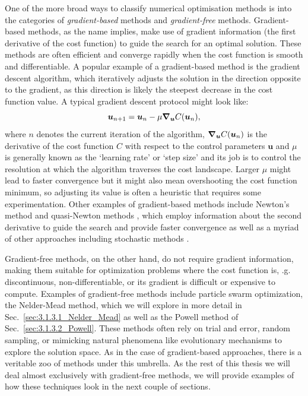 \documentclass[a4paper,oneside,11pt]{book}
\newcommand{\ubb}{\boldsymbol{u}}
\begin{document}
One of the more broad ways to classify numerical optimisation methods is into the categories of \emph{gradient-based} methods and \emph{gradient-free} methods. Gradient-based methods, as the name implies, make use of gradient information (the first derivative of the cost function) to guide the search for an optimal solution. These methods are often efficient and converge rapidly when the cost function is smooth and differentiable. A popular example of a gradient-based method is the gradient descent algorithm, which iteratively adjusts the solution in the direction opposite to the gradient, as this direction is likely the steepest decrease in the cost function value. A typical gradient descent protocol might look like:
\begin{equation}\label{eq:gradient_descent}
    \ubb_{n + 1} = \ubb_n - \mu \grad_{\ubb} C(\ubb_n),
\end{equation}
where $n$ denotes the current iteration of the algorithm, $\grad_{\ubb} C(\ubb_n)$ is the derivative of the cost function $C$ with respect to the control parameters $\ubb$ and $\mu$ is generally known as the `learning rate' or `step size' and its job is to control the resolution at which the algorithm traverses the cost landscape. Larger $\mu$ might lead to faster convergence but it might also mean overshooting the cost function minimum, so adjusting its value is often a heuristic that requires some experimentation. Other examples of gradient-based methods include Newton's method and quasi-Newton methods \cite{suli_introduction_2003}, which employ information about the second derivative to guide the search and provide faster convergence as well as a myriad of other approaches including stochastic methods \cite{bottou_tradeoffs_2007}. 

Gradient-free methods, on the other hand, do not require gradient information, making them suitable for optimization problems where the cost function is, \@e.g.~ discontinuous, non-differentiable, or its gradient is difficult or expensive to compute. Examples of gradient-free methods include particle swarm optimization\cite{bonyadi_particle_2017}, the Nelder-Mead method, which we will explore in more detail in Sec.~\ref{sec:3.1.3.1_Nelder_Mead} as well as the Powell method of Sec.~\ref{sec:3.1.3.2_Powell}. These methods often rely on trial and error, random sampling, or mimicking natural phenomena like evolutionary mechanisms\cite{vikhar_evolutionary_2016} to explore the solution space. As in the case of gradient-based approaches, there is a veritable zoo of methods under this umbrella. As the rest of this thesis we will deal almost exclusively with gradient-free methods, we will provide examples of how these techniques look in the next couple of sections.
\end{document}
